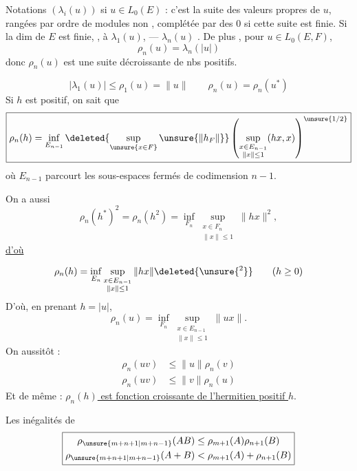 
Notations $(\lambda_i(u))$ si $u\in L_0(E)$ : c'est la suite des valeurs  propres de $u$, rangées par ordre de modules non , complétée par des $0$ si cette suite est finie.
Si la dim de $E$ est finie, ,    à $\lambda_1(u)$, --- $\lambda_n(u)$    .
De plus , pour $u\in L_0(E,F)$,
\[
\boxed{\rho_n(u)=\lambda_n(|u|)}
\]
donc $\rho_n(u)$ est une suite décroissante de nbs positifs.

\qquad{}
\[
\boxed{|\lambda_1(u)|\leq\rho_1(u)=\|u\|}\qquad
\boxed{\rho_n(u)=\rho_n(u^*)}
\]
Si $h$ est  positif, on sait que
\[
\boxed{\rho_n(h)=\inf_{E_{n-1}}\deleted{\sup_{\unsure{x\in F}}\unsure{\|h_F\|}}\left(\sup_{\substack{x\in E_{n-1}\\\|x\|\leq1}}(hx,x)\right)^{\unsure{1/2}}}
\]
où  $E_{n-1}$ parcourt  les sous-espaces  fermés de codimension $n-1$.

On a aussi
\[
\rho_n(h^{*})^2=\rho_n(h^2)=\inf_{F_n}\sup_{\substack{x\in F_n\\\|x\|\leq1}}\|hx\|^2,
\]
\uline{d'où} 

\[
\rho_n(h)=\inf_{E_n}\sup_{\substack{x\in E_{n-1}\\\|x\|\leq1}}\|hx\|\deleted{\unsure{{}^2}}\qquad(h\geq0)
\]
D'où, en prenant $h=|u|$,
\[
\boxed{\rho_n(u)=\inf_{F_n}\sup_{\substack{x\in E_{n-1}\\\|x\|\leq1}}\|ux\|}.
\]
On   aussitôt :
\[
\boxed{\begin{aligned}
\rho_n(uv)&\leq\|u\|\rho_n(v)\\
\rho_n(uv)&\leq\|v\|\rho_n(u)
\end{aligned}}
\]
Et de même : \uline{$\rho_n(h)$ est fonction croissante de l'hermitien positif $h$}.

Les inégalités de 
\[
\boxed{\begin{aligned}
\rho_{\unsure{m+n+1|m+n-1}}(AB)&\leq\rho_{m+1}(A)\rho_{n+1}(B)\\
\rho_{\unsure{m+n+1|m+n-1}}(A+B)&<\rho_{m+1}(A)+\rho_{n+1}(B)
\end{aligned}}
\]

